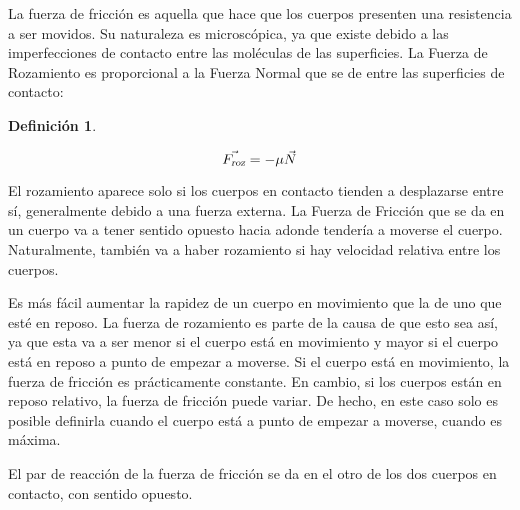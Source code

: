 \documentclass[a5paper,12pt,twoside]{book}
\newtheorem{defn}{{Definición}}[chapter]
\begin{document}
La fuerza de fricción es aquella que hace que los cuerpos presenten una resistencia a ser movidos. Su naturaleza es microscópica, ya que existe debido a las imperfecciones de contacto entre las moléculas de las superficies. La Fuerza de Rozamiento es proporcional a la Fuerza Normal que se de entre las superficies de contacto:

\begin{mdframed}[style=MyFrame1]
    \begin{defn}
    \end{defn}
    \begin{equation*}
        \Vec{{{F}_\textsl{{roz}}}} = - \mu \Vec{N}
    \end{equation*}
\end{mdframed}

El rozamiento aparece solo si los cuerpos en contacto tienden a desplazarse entre sí, generalmente debido a una fuerza externa. La Fuerza de Fricción que se da en un cuerpo va a tener sentido opuesto hacia adonde tendería a moverse el cuerpo. Naturalmente, también va a haber rozamiento si hay velocidad relativa entre los cuerpos.

\begin{center}
    \vspace{-2cm}
    \def\svgwidth{\linewidth}
    
    \vspace{-2cm}
\end{center}

Es más fácil aumentar la rapidez de un cuerpo en movimiento que la de uno que esté en reposo. La fuerza de rozamiento es parte de la causa de que esto sea así, ya que esta va a ser menor si el cuerpo está en movimiento y mayor si el cuerpo está en reposo a punto de empezar a moverse. Si el cuerpo está en movimiento, la fuerza de fricción es prácticamente constante. En cambio, si los cuerpos están en reposo relativo, la fuerza de fricción puede variar. De hecho, en este caso solo es posible definirla cuando el cuerpo está a punto de empezar a moverse, cuando es máxima.

\begin{center}
    \vspace{-2cm}
    \def\svgwidth{\linewidth}
    
    \vspace{-2cm}
\end{center}

El par de reacción de la fuerza de fricción se da en el otro de los dos cuerpos en contacto, con sentido opuesto.
\end{document}
